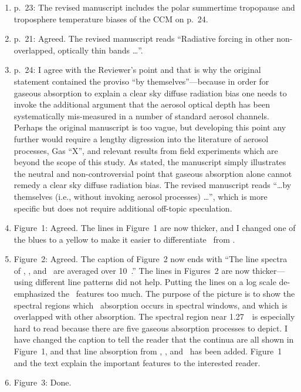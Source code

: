 \documentclass[12pt,twoside]{article}
\begin{document}
\begin{enumerate}
\begin{enumerate}
\end{enumerate}
\item p.~23: The revised manuscript includes the polar summertime 
tropopause and troposphere temperature biases of the CCM on p.~24.
\item p.~21: Agreed.
The revised manuscript reads ``Radiative forcing in other
non-overlapped, optically thin bands \ldots''.
\item p.~24: I agree with the Reviewer's point and that is why the
original statement contained the proviso ``by themselves''---because 
in order for gaseous absorption to explain a clear sky diffuse
radiation bias one needs to invoke the additional argument that the
aerosol optical depth has been systematically mis-measured in a number
of standard aerosol channels. 
Perhaps the original manuscript is too vague, but developing this
point any further would require a lengthy digression into the
literature of aerosol processes, Gas ``X'', and relevant results from
field experiments which are beyond the scope of this study.
As stated, the manuscript simply illustrates the neutral and
non-controversial point that gaseous absorption alone cannot remedy a
clear sky diffuse radiation bias. 
The revised manuscript reads ``\ldots by themselves (i.e., without
invoking aerosol processes) \ldots'', which is more specific but does
not require additional off-topic speculation.
\item Figure~1: Agreed. 
The lines in Figure~1 are now thicker, and I changed one of the blues
to a yellow to make it easier to differentiate \Od\ from \OdNd.
\item Figure~2: Agreed.
The caption of Figure~2 now ends with ``The line spectra of \HdO,
\COd, and \Od\ are averaged over 10~\xcm.'' 
The lines in Figures~2 are now thicker---using different line patterns
did not help.
Putting the lines on a log scale de-emphasized the \OdX\ features
too much.
The purpose of the picture is to show the spectral regions which
\OdX\ absorption occurs in spectral windows, and which is overlapped
with other absorption.
The spectral region near 1.27~\um\ is especially hard to read because
there are five gaseous absorption processes to depict.
I have changed the caption to tell the reader that the continua are
all shown in Figure~1, and that line absorption from \HdO, \Od, and
\COd\ has been added.
Figure~1 and the text explain the important features to the
interested reader.
\item Figure~3: Done.
\end{enumerate}

%
%
\end{document}
